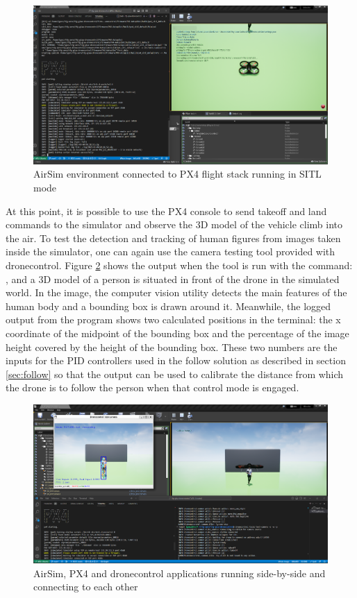 \begin{figure}
  \centering
  \includegraphics[width=\textwidth, keepaspectratio]{img/airsim-sitl.png}
  \caption{AirSim environment connected to PX4 flight stack running in SITL mode}
  \label{fig:airsim-sitl}
\end{figure}

At this point, it is possible to use the PX4 console to send takeoff and land commands to the simulator and observe the 3D model of the vehicle climb into the air.
To test the detection and tracking of human figures from images taken inside the simulator, one can again use the camera testing tool provided with dronecontrol.
Figure \ref{fig:airsim-sitl-pose} shows the output when the tool is run with the command:
, and a 3D model of a person is situated in front of the drone in the simulated world.
In the image, the computer vision utility detects the main features of the human body and a bounding box is drawn around it.
Meanwhile, the logged output from the program shows two calculated positions in the terminal: the x coordinate of the midpoint of the bounding box and the percentage of the image height covered by the height of the bounding box.
These two numbers are the inputs for the PID controllers used in the follow solution as described in section \ref{sec:follow} so that the output can be used to calibrate the distance from which the drone is to follow the person when that control mode is engaged.

\begin{figure}
  \centering
  \includegraphics[width=\textwidth, keepaspectratio]{img/airsim-sitl-pose.png}
  \caption{AirSim, PX4 and dronecontrol applications running side-by-side and connecting to each other}
  \label{fig:airsim-sitl-pose}
\end{figure}

